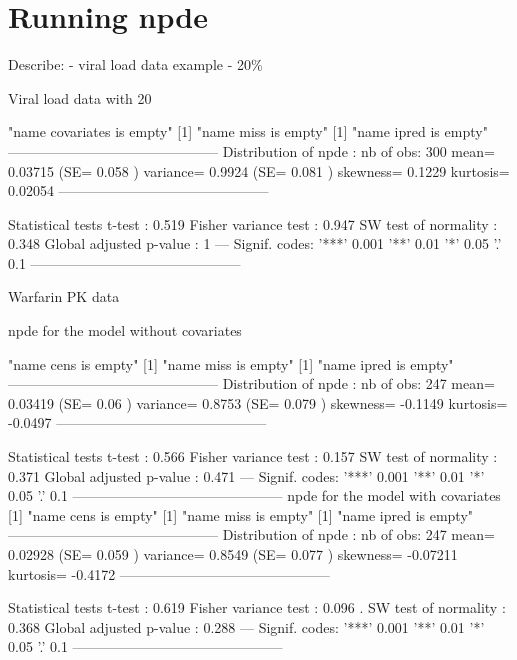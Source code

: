 \documentclass{article}
\begin{document}
\section{Running npde }

Describe:
- viral load data example
  - 20\% 

\begin{Schunk}
\begin{Soutput}
Viral load data with 20%
\end{Soutput}
\begin{Soutput}
[1] "name covariates is empty"
[1] "name miss is empty"
[1] "name ipred is empty"
---------------------------------------------
Distribution of npde :
      nb of obs: 300 
           mean= 0.03715   (SE= 0.058 )
       variance= 0.9924   (SE= 0.081 )
       skewness= 0.1229 
       kurtosis= 0.02054 
---------------------------------------------

Statistical tests
  t-test                     : 0.519
  Fisher variance test       : 0.947
  SW test of normality       : 0.348
Global adjusted p-value      : 1
---
Signif. codes: '***' 0.001 '**' 0.01 '*' 0.05 '.' 0.1 
---------------------------------------------
\end{Soutput}
\begin{Soutput}
Warfarin PK data
\end{Soutput}
\begin{Soutput}
      npde for the model without covariates
\end{Soutput}
\begin{Soutput}
[1] "name cens is empty"
[1] "name miss is empty"
[1] "name ipred is empty"
---------------------------------------------
Distribution of npde :
      nb of obs: 247 
           mean= 0.03419   (SE= 0.06 )
       variance= 0.8753   (SE= 0.079 )
       skewness= -0.1149 
       kurtosis= -0.0497 
---------------------------------------------

Statistical tests
  t-test                     : 0.566
  Fisher variance test       : 0.157
  SW test of normality       : 0.371
Global adjusted p-value      : 0.471
---
Signif. codes: '***' 0.001 '**' 0.01 '*' 0.05 '.' 0.1 
---------------------------------------------
      npde for the model with covariates
[1] "name cens is empty"
[1] "name miss is empty"
[1] "name ipred is empty"
---------------------------------------------
Distribution of npde :
      nb of obs: 247 
           mean= 0.02928   (SE= 0.059 )
       variance= 0.8549   (SE= 0.077 )
       skewness= -0.07211 
       kurtosis= -0.4172 
---------------------------------------------

Statistical tests
  t-test                     : 0.619
  Fisher variance test       : 0.096 .
  SW test of normality       : 0.368
Global adjusted p-value      : 0.288
---
Signif. codes: '***' 0.001 '**' 0.01 '*' 0.05 '.' 0.1 
---------------------------------------------
\end{Soutput}
\end{Schunk}
\end{document}
